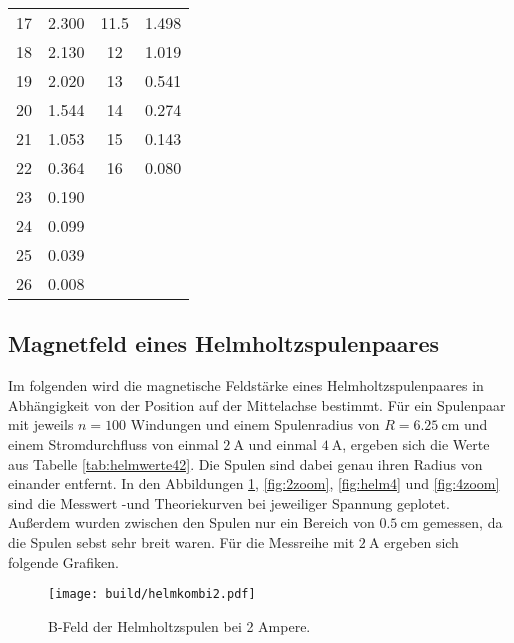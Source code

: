 \begin{table}
\begin{tabular}{S[table-format=2.0] S| |S[table-format=2.1] S}
    17 & 2.300 & 11.5 & 1.498 \\
    18 & 2.130 & 12   & 1.019 \\
    19 & 2.020 & 13   & 0.541 \\
    20 & 1.544 & 14   & 0.274 \\
    21 & 1.053 & 15   & 0.143 \\
    22 & 0.364 & 16   & 0.080 \\
    23 & 0.190 &      &       \\
    24 & 0.099 &      &       \\
    25 & 0.039 &      &       \\
    26 & 0.008 &      &       \\
    \bottomrule
  \end{tabular}
\end{table}
\newpage

\subsection{Magnetfeld eines Helmholtzspulenpaares}
Im folgenden wird die magnetische Feldstärke eines Helmholtzspulenpaares in
Abhängigkeit von der Position auf der Mittelachse bestimmt.
Für ein Spulenpaar mit jeweils $n = 100$ Windungen und einem Spulenradius von
$R = \SI{6.25}{\centi\meter}$ und einem Stromdurchfluss von einmal $\SI{2}{\ampere}$
und einmal $\SI{4}{\ampere}$, ergeben sich die Werte aus Tabelle
\ref{tab:helmwerte42}. Die Spulen sind dabei genau ihren Radius von einander
entfernt. In den Abbildungen \ref{fig:helm2}, \ref{fig:2zoom}, \ref{fig:helm4}
und \ref{fig:4zoom} sind die Messwert -und Theoriekurven bei
jeweiliger Spannung geplotet.
Außerdem wurden zwischen den Spulen nur ein Bereich von $\SI{0.5}{\centi\meter}$
gemessen, da die Spulen sebst sehr breit waren.
Für die Messreihe mit $\SI{2}{\ampere}$ ergeben sich folgende Grafiken.
\begin{figure}
  \texttt{[image: build/helmkombi2.pdf]}
  \caption{B-Feld der Helmholtzspulen bei 2 Ampere.}
  \label{fig:helm2}
\end{figure}

